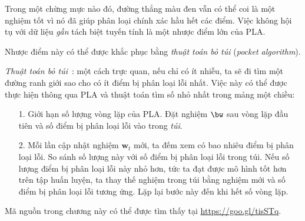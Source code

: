  
Trong một chừng mực nào đó, đường thẳng màu đen vẫn có thể coi là một nghiệm tốt vì nó đã giúp phân loại chính xác hầu hết các điểm. Việc không hội tụ với dữ liệu \textit{gần} tách biệt tuyến tính là một nhược điểm lớn của PLA. 

Nhược điểm này có thể được khắc phục bằng \textit{thuật toán bỏ túi} (\textit{pocket algorithm}).
 
\textit{Thuật toán bỏ túi}~\cite{abu2012learning}: một cách trực quan, nếu chỉ có
ít nhiễu, ta sẽ đi tìm một đường ranh giới sao cho có ít điểm bị phân loại lỗi
nhất. Việc này có thể được thực hiện thông qua PLA và thuật toán tìm số nhỏ nhất trong mảng một chiều:
\begin{enumerate}
    \item[1.] Giới hạn số lượng vòng lặp của PLA. Đặt nghiệm $\bw$ sau vòng lặp đầu tiên và số điểm bị phân loại lỗi vào trong \textit{túi}.

    \item[2.]  Mỗi lần cập nhật nghiệm $\mathbf{w}_t$ mới, ta đếm xem có bao nhiêu điểm bị phân loại lỗi. So sánh số lượng này với số điểm bị phân loại lỗi trong túi. Nếu số lượng điểm bị phân loại lỗi này nhỏ hơn, tức ta đạt được mô hình tốt hơn trên tập huấn luyện, ta thay thế nghiệm trong túi bằng nghiệm mới và số điểm bị phân loại lỗi tương ứng. Lặp lại bước này đến khi hết số vòng lặp. 
\end{enumerate}
 


Mã nguồn trong chương này có thể được tìm thấy tại \url{https://goo.gl/tisSTq}. 
 
 
 

 
 
 
